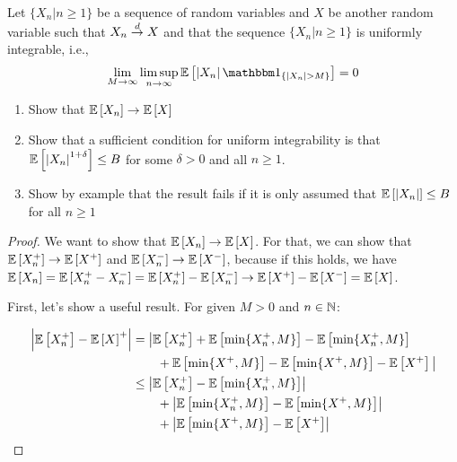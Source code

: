 \documentclass[12pt, letterpaper]{paper}
\begin{document}
\begin{question}
  Let $\{ X_n | n \geq 1\}$ be a sequence of random variables and $X$ be
  another random variable such that $X_n \overset{d}{\to} X$ and that the
  sequence $\{X_n | n \geq 1 \}$ is uniformly integrable, i.e.,
  \begin{equation*}
    \lim_{M \to \infty} \limsup_{n \to \infty} \exV{ \abs{ X_n} \indicate{ \abs{X_n}
        > M}} = 0
  \end{equation*}

  \begin{enumerate}
  \item Show that $\mathbb{E} \left [  X_n \right ] \to \mathbb{E} \left [ X \right ]$
  \item Show that a sufficient condition for uniform integrability is
    that $\mathbb{E} \left [  \left \lvert X_n \right \rvert^{1+\delta} \right ] \leq B$ for some $\delta > 0$ and all
    $n \geq 1$.
  \item Show by example that the result fails if it is only assumed
    that $\mathbb{E} \left [ \left \lvert X_n \right \rvert \right ] \leq B$ for all $n \geq 1$
  \end{enumerate}

  \begin{proof}
   We want to show that $\mathbb{E} \left [ X_n \right ]\to\mathbb{E} \left [ X \right ]$. For that, we can show
   that $\mathbb{E} \left [ X_n^{+} \right ]\to\mathbb{E} \left [ X^{+} \right ]$ and $\mathbb{E} \left [ X_n^{-} \right ] \to \mathbb{E} \left [ X^{-} \right ]$,
   because if this holds, we have $\mathbb{E} \left [ X_n \right ]= \mathbb{E} \left [ X_n^{+}-X_n^{-} \right ] =
   \mathbb{E} \left [ X_n^{+} \right ] - \mathbb{E} \left [ X_n^{-} \right ] \to \mathbb{E} \left [ X^{+} \right ] - \mathbb{E} \left [ X^{-} \right ] = \mathbb{E} \left [ X \right ]$.

   First, let's show a useful result. For given $M>0$ and $n\in\mathbb{N}$:

   \begin{align*}
        \left \lvert \mathbb{E} \left [ X_n^+ \right ] - \mathbb{E} \left [ X \right ]^+ \right \rvert &= \big| \mathbb{E} \left [ X_n^+ \right ] +
                                        \mathbb{E} \left [ \min\{X_n^+,M\} \right ] -
                                        \mathbb{E} \left [ \min\{X_n^+,M\} \right ]\\
                                      & \quad \quad + \mathbb{E} \left [ \min\{X^+,M\} \right ] - \mathbb{E} \left [ \min\{X^+,M\} \right ]- \mathbb{E} \left [ X^+ \right ] \big
                                        |\\
                                      &\leq \left \lvert \mathbb{E} \left [ X_n^+ \right ] - \mathbb{E} \left [ \min\{X_n^+,M\} \right ]  \right \rvert \\
                                      &\quad\quad+ \left \lvert \mathbb{E} \left [ \min\{X_n^+,M\} \right ]-
                                        \mathbb{E} \left [ \min\{X^+,M\} \right ] \right \rvert\\
                                      &\quad\quad+\left \lvert \mathbb{E} \left [ \min\{X^+,M\} \right ] - \mathbb{E} \left [ X^+ \right ]  \right \rvert\\
      \end{align*}


\end{proof}
\end{question}
\end{document}
